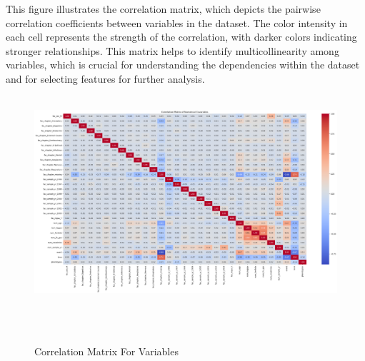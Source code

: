 \noindent This figure illustrates the correlation matrix, which depicts the pairwise correlation coefficients between variables in the dataset. The color intensity in each cell represents the strength of the correlation, with darker colors indicating stronger relationships. This matrix helps to identify multicollinearity among variables, which is crucial for understanding the dependencies within the dataset and for selecting features for further analysis.
\begin{figure}[h]
    \centering
    \includegraphics[scale=0.28]{Figures/EDA/corr.png}
    \caption{Correlation Matrix For Variables}
    \label{fig:corr_matrix}
\end{figure}

\clearpage

